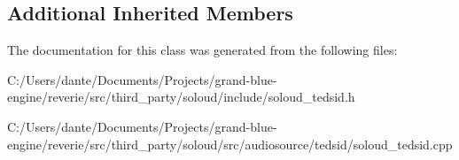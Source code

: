 \subsection*{Additional Inherited Members}


The documentation for this class was generated from the following files\+:\begin{DoxyCompactItemize}
\item 
C\+:/\+Users/dante/\+Documents/\+Projects/grand-\/blue-\/engine/reverie/src/third\+\_\+party/soloud/include/soloud\+\_\+tedsid.\+h\item 
C\+:/\+Users/dante/\+Documents/\+Projects/grand-\/blue-\/engine/reverie/src/third\+\_\+party/soloud/src/audiosource/tedsid/soloud\+\_\+tedsid.\+cpp\end{DoxyCompactItemize}
